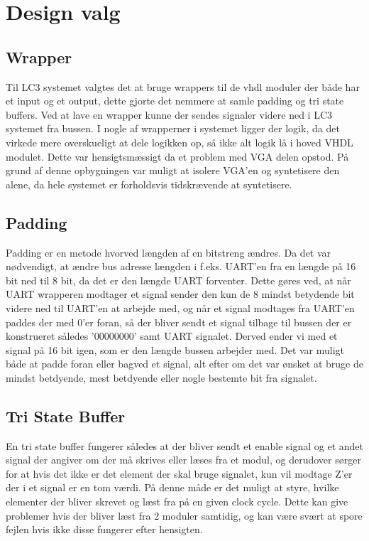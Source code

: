 \section{Design valg}

\subsection{Wrapper}
Til LC3 systemet valgtes det at bruge wrappers til de vhdl moduler der både har et input og et output, dette gjorte det nemmere at samle padding og tri state buffers. Ved at lave en wrapper kunne der sendes signaler videre ned i LC3 systemet fra bussen. I nogle af wrapperner i systemet ligger der logik, da det virkede mere overskueligt at dele logikken op, så ikke alt logik lå i hoved VHDL modulet. Dette var hensigtsmæssigt da et problem med VGA delen opstod. På grund af denne opbygningen var muligt at isolere VGA'en og syntetisere den alene, da hele systemet er forholdsvis tidskrævende at syntetisere.

\subsection{Padding}
Padding er en metode hvorved længden af en bitstreng ændres. Da det var nødvendigt, at ændre bus adresse længden i f.eks. UART'en fra en længde på 16 bit ned til 8 bit, da det er den længde UART forventer. Dette gøres ved, at når UART wrapperen modtager et signal sender den kun de 8 mindst betydende bit videre ned til UART'en at arbejde med, og når et signal modtages fra UART'en paddes der med 0'er foran, så der bliver sendt et signal tilbage til bussen der er konstrueret således '00000000' samt UART signalet. Derved ender vi med et signal på 16 bit igen, som er den længde bussen arbejder med. Det var muligt både at padde foran eller bagved et signal, alt efter om det var ønsket at bruge de mindst betdyende, mest betdyende eller nogle bestemte bit fra signalet.


\subsection{Tri State Buffer}
En tri state buffer fungerer således at der bliver sendt et enable signal og et andet signal der angiver om der må skrives eller læses fra et modul, og derudover sørger for at hvis det ikke er det element der skal bruge signalet, kun vil modtage Z'er der i et signal er en tom værdi. På denne måde er det muligt at styre, hvilke elementer der bliver skrevet og læst fra på en given clock cycle. Dette kan give problemer hvis der bliver læst fra 2 moduler samtidig, og kan være svært at spore fejlen hvis ikke disse fungerer efter hensigten.


